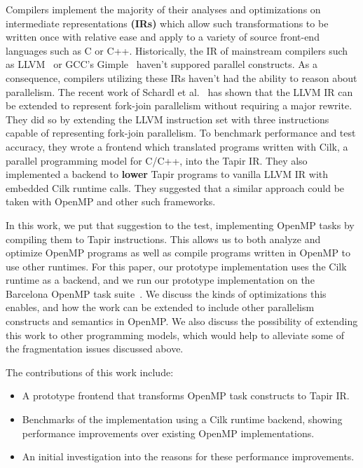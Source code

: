 \documentclass[sigconf]{acmart}
\newcommand{\wmnote}[1]{{\scriptsize \color{red} [[ Billy: #1]]}}
\newcommand{\gsnote}[1]{{\scriptsize \color{blue} [[ George: #1]]}}
\begin{document}

Compilers implement the majority of their analyses and optimizations on
intermediate representations \textbf{(IRs)} which allow such transformations
to be written once with relative ease and apply to a variety of source
front-end languages such as C or C++.  Historically, the IR of mainstream
compilers such as LLVM~\cite{lattner2004llvm} or GCC's
Gimple~\cite{merrill2003generic} haven't suppored parallel constructs. As a
consequence, compilers utilizing these IRs haven't had the ability to reason
about parallelism. The recent work of Schardl et al.~\cite{tapir} has shown
that the LLVM IR can be extended to represent fork-join parallelism without
requiring a major rewrite.  They did so by extending the LLVM instruction set
with three instructions capable of representing fork-join parallelism. To
benchmark performance and test accuracy, they wrote a frontend which translated
programs written with Cilk, a parallel programming model for C/C++, into the
Tapir IR. They also implemented a backend to \textbf{lower} Tapir programs to
vanilla LLVM IR with embedded Cilk runtime calls. They suggested that a similar
approach could be taken with OpenMP and other such frameworks.

In this work, we put that suggestion to the test, implementing OpenMP tasks by
compiling them to Tapir instructions. This allows us to both analyze and optimize
OpenMP programs as well as compile programs written in OpenMP to use other runtimes.
For this paper, our prototype implementation uses the Cilk runtime as a backend,
and we run our prototype implementation on the Barcelona OpenMP task suite~\cite{barcelona}. 
We discuss the kinds of optimizations this enables, and how
the work can be extended to include other parallelism constructs and semantics
in OpenMP. We also discuss the possibility of extending this work to other
programming models, which would help to alleviate some of the fragmentation
issues discussed above. 

The contributions of this work include: 

\begin{itemize}
  \item A prototype frontend that transforms OpenMP task constructs to Tapir IR.
  \item Benchmarks of the implementation using a Cilk runtime backend, showing
        performance improvements over existing OpenMP implementations.
  \item An initial investigation into the reasons for these performance improvements.
\end{itemize}
\end{document}
